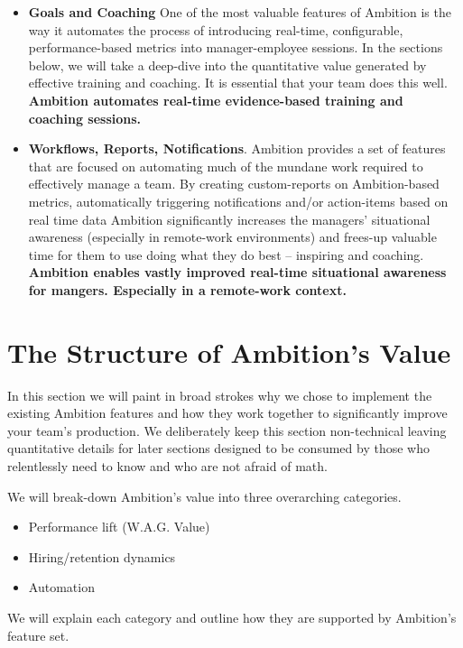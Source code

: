 \documentclass[paper=a4, fontsize=11pt abstract]{scrartcl}
\numberwithin{equation}{section}		%
\numberwithin{figure}{section}			%
\numberwithin{table}{section}				%
\begin{document}
\begin{itemize}
    \item \textbf{Goals and Coaching} One of the most valuable features of Ambition is the way it automates the process of introducing real-time, configurable, performance-based metrics into manager-employee sessions.  In the sections below, we will take a deep-dive into the quantitative value generated by effective training and coaching.  It is essential that your team does this well. \textbf{Ambition automates real-time evidence-based training and coaching sessions.}
   
   \item \textbf{Workflows, Reports, Notifications}. Ambition provides a set of features that are focused on automating much of the mundane work required to effectively manage a team.  By creating custom-reports on Ambition-based metrics, automatically triggering notifications and/or action-items based on real time data Ambition significantly increases the managers' situational awareness (especially in remote-work environments) and frees-up valuable time for them to use doing what they do best -- inspiring and coaching. \textbf{Ambition enables vastly improved real-time situational awareness for mangers.  Especially in a remote-work context.} 
    
\end{itemize}

\section{The Structure of Ambition's Value}
In this section we will paint in broad strokes why we chose to implement the existing Ambition features and how they work together to significantly improve your team's production.  We deliberately keep this section non-technical leaving quantitative details for later sections designed to be consumed by those who relentlessly need to know and who are not afraid of math.

We will break-down Ambition's value into three overarching categories.
\begin{itemize}
    \item Performance lift (W.A.G. Value)
    \item Hiring/retention dynamics
    \item Automation
\end{itemize}
We will explain each category and outline how they are supported by Ambition's feature set.
\end{document}
